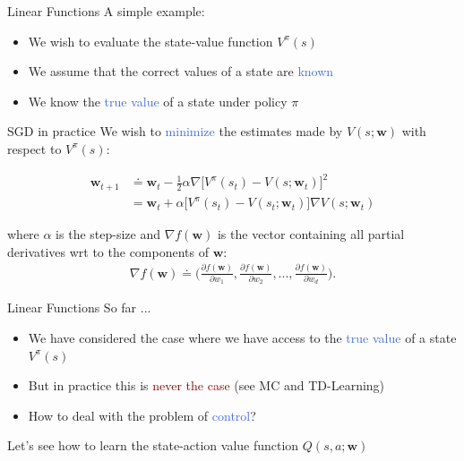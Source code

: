 \documentclass{beamer}
\begin{document}
\begin{frame}{Linear Functions}
	A simple example:
	\begin{itemize}
		\item We wish to evaluate the state-value function $V^\pi(s)$
		\item We assume that the correct values of a state are \textcolor{RoyalBlue}{known} 
		\item We know the \textcolor{RoyalBlue}{true value} of a state under policy $\pi$
	\end{itemize}

	\begin{block}{SGD in practice}
		We wish to \textcolor{RoyalBlue}{minimize} the estimates made by $V(s;\mathbf{w})$ with respect to $V^{\pi}(s)$:
		
		\begin{align*}
			\mathbf{w}_{t+1} & \doteq \mathbf{w}_t - \frac{1}{2} \alpha\nabla\Big[V^{\pi}(s_t)-V(s;\mathbf{w}_t)\Big]^{2} \\ 
					 & = \mathbf{w}_t +\alpha\Big[V^{\pi}(s_t)-V(s_t;\mathbf{w}_t)\Big]\nabla V(s;\mathbf{w}_t)
		\end{align*}

		where $\alpha$ is the step-size and $\nabla f(\mathbf{w})$ is the vector containing all partial derivatives wrt to the components of $\mathbf{w}$:
		\begin{align*}
			\nabla f(\mathbf{w}) \doteq \Big(\frac{\partial f(\mathbf{w})}{\partial w_1}, \frac{\partial f(\mathbf{w})}{\partial w_2}, ..., \frac{\partial f(\mathbf{w})}{\partial w_d}\Big).
		\end{align*}

	\end{block}
\end{frame}

\begin{frame}{Linear Functions}
	So far ...
	\begin{itemize}
		\item We have considered the case where we have access to the \textcolor{RoyalBlue}{true value} of a state $V^{\pi}(s)$
		\item But in practice this is \textcolor{Maroon}{never the case} (see MC and TD-Learning)
		\item How to deal with the problem of \textcolor{RoyalBlue}{control}?
	\end{itemize}

	\bigskip 

	Let's see how to learn the state-action value function $Q(s,a;\mathbf{w})$

\end{frame}
\end{document}
